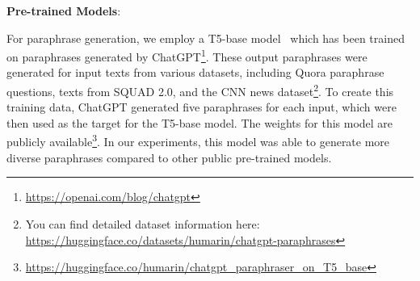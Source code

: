 \documentclass[11pt]{article}
\begin{document}
\textbf{Pre-trained Models}:
\noindent

For paraphrase generation, we employ a T5-base model~\cite{DBLP:journals/corr/abs-1910-10683} which has been trained on paraphrases generated by ChatGPT\footnote{\url{https://openai.com/blog/chatgpt}}. These output paraphrases were generated for input texts from various datasets, including Quora paraphrase questions, texts from SQUAD 2.0, and the CNN news dataset\footnote{You can find detailed dataset information here: \url{https://huggingface.co/datasets/humarin/chatgpt-paraphrases}}. To create this training data, ChatGPT generated five paraphrases for each input, which were then used as the target for the T5-base model. The weights for this model are publicly available\footnote{\url{https://huggingface.co/humarin/chatgpt_paraphraser_on_T5_base}}. In our experiments, this model was able to generate more diverse paraphrases compared to other public pre-trained models.

\end{document}
